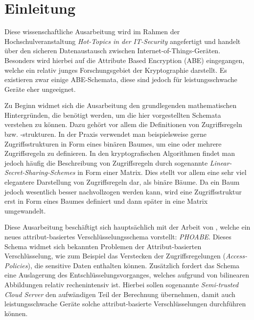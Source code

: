 \section{Einleitung}
Diese wissenschaftliche Ausarbeitung wird im Rahmen der Hochschulveranstaltung
\textit{Hot-Topics in der IT-Security} angefertigt und handelt über den
sicheren Datenaustausch zwischen Internet-of-Things-Geräten.  Besonders wird
hierbei auf die Attribute Based Encryption (ABE) eingegangen, welche ein
relativ junges Forschungsgebiet der Kryptographie darstellt. Es existieren
zwar einige ABE-Schemata, diese sind jedoch für leistungsschwache Geräte eher
ungeeignet.

Zu Beginn widmet sich die Ausarbeitung den grundlegenden mathematischen
Hintergründen, die benötigt werden, um die hier vorgestellten Schemata verstehen
zu können. Dazu gehört vor allem die Definitionen von Zugriffsregeln bzw.
-strukturen. In der Praxis verwendet man beispielsweise gerne Zugriffsstrukturen
in Form eines binären Baumes, um eine oder mehrere Zugriffsregeln zu definieren.
In den kryptografischen Algorithmen findet man jedoch häufig die Beschreibung
von Zugriffsregeln durch sogenannte \textit{Linear-Secret-Sharing-Schemes} in
Form einer Matrix. Dies stellt vor allem eine sehr viel elegantere Darstellung
von Zugriffsregeln dar, als binäre Bäume. Da ein Baum jedoch wesentlich besser
nachvollzogen werden kann, wird eine Zugriffsstruktur erst in Form eines Baumes
definiert und dann später in eine Matrix umgewandelt.

Diese Ausarbeitung beschäftigt sich hauptsächlich mit der Arbeit von
\cite{phoabe}, welche ein neues attribut-basiertes Verschlüsselungsschema
vorstellt: \textit{PHOABE}. Dieses Schema widmet sich bekannten Problemen der
Attribut-basierten Verschlüsselung, wie zum Beispiel das Verstecken der
Zugriffsregelungen (\textit{Access-Policies}), die sensitive Daten enthalten
können. Zusätzlich fordert das Schema eine Auslagerung des
Entschlüsselungsvorganges, welches aufgrund von bilinearen Abbildungen relativ
rechenintensiv ist. Hierbei sollen sogenannte \textit{Semi-trusted Cloud
Server} den aufwändigen Teil der Berechnung über\-nehmen, damit auch
leistungsschwache Geräte solche attribut-basierte Ver\-schlüs\-sel\-ung\-en
durchführen können.
